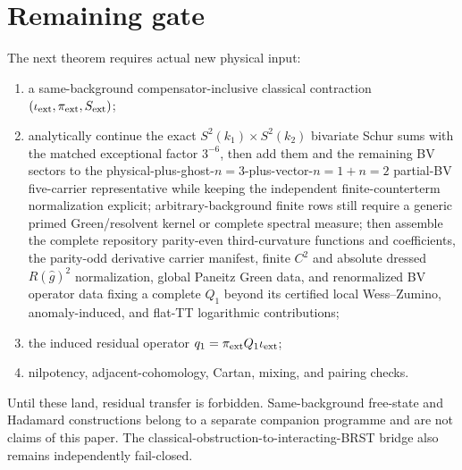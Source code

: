 \documentclass[11pt]{article}
\theoremstyle{definition}
\theoremstyle{remark}
\begin{document}
\section{Remaining gate}

The next theorem requires actual new physical input:
\begin{enumerate}
\item a same-background compensator-inclusive classical contraction
$(\iota_{\rm ext},\pi_{\rm ext},S_{\rm ext})$;
	\item analytically continue the exact $S^2(k_1)\times S^2(k_2)$ bivariate
Schur sums with the matched exceptional factor $3^{-6}$, then add them and the
remaining BV sectors to the physical-plus-ghost-$n=3$-plus-vector-$n=1+n=2$
partial-BV five-carrier representative while keeping the independent
finite-counterterm normalization explicit; arbitrary-background finite rows
still require a generic primed Green/resolvent kernel or complete spectral
measure; then assemble the
complete repository parity-even third-curvature functions and coefficients,
the parity-odd derivative carrier manifest, finite
$C^2$ and absolute dressed $R(\widehat g)^2$ normalization,
global Paneitz Green data, and renormalized BV operator data fixing a complete
$Q_1$ beyond its certified local Wess--Zumino, anomaly-induced, and flat-TT
logarithmic contributions;
\item the induced residual operator
$q_1=\pi_{\rm ext}Q_1\iota_{\rm ext}$;
\item nilpotency, adjacent-cohomology, Cartan, mixing, and pairing checks.
\end{enumerate}
Until these land, residual transfer is forbidden.  Same-background free-state
and Hadamard constructions belong to a separate companion programme and are
not claims of this paper.  The classical-obstruction-to-interacting-BRST
bridge also remains independently fail-closed.
\end{document}

